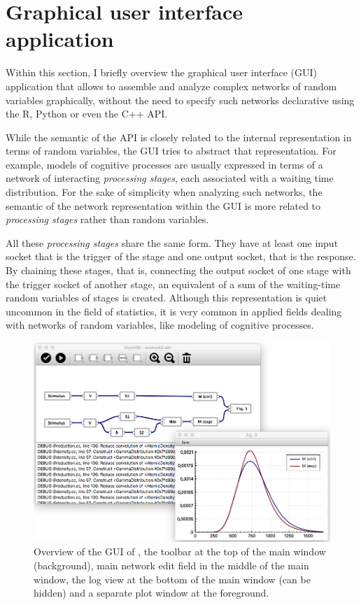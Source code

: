 \section{Graphical user interface application} \label{sec:gui}
Within this section, I briefly overview the graphical user interface (GUI) application that allows to assemble and analyze complex networks of random variables graphically, without the need to specify such networks declarative using the R, Python or even the C++ API. 

While the semantic of the  API is closely related to the internal representation in terms of random variables, the GUI tries to abstract that representation. For example, models of cognitive processes are usually expressed in terms of a network of interacting \emph{processing stages}, each associated with a waiting time distribution. For the sake of simplicity when analyzing such networks, the semantic of the network representation within the GUI is more related to \emph{processing stages} rather than random variables. 

All these \emph{processing stages} share the same form. They have at least one input socket that is the trigger of the stage and one output socket, that is the response. By chaining these stages, that is, connecting the output socket of one stage with the trigger socket of another stage, an equivalent of a sum of the waiting-time random variables of stages is created. Although this representation is quiet uncommon in the field of statistics, it is very common in applied fields dealing with networks of random variables, like modeling of cognitive processes.

\begin{figure}[!ht]
 \centering
 \includegraphics[width=.75\textwidth]{fig/GUI2.png}
 \caption{Overview of the GUI of , the toolbar at the top of the main window (background), main network edit field in the middle of the main window, the log view at the bottom of the main window (can be hidden) and a separate plot window at the foreground.} \label{fig:gui}
\end{figure}

